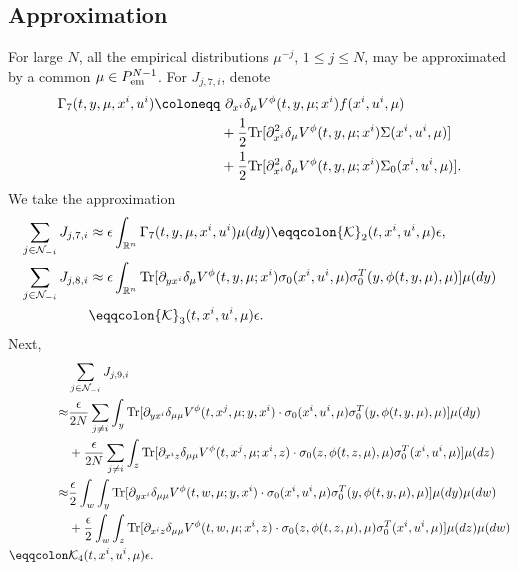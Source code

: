 \documentclass{amsart}
\theoremstyle{definition}
\theoremstyle{remark}
\def\cal{\mathcal}
\def\deltae{\epsilon}
\numberwithin{equation}{section}
\begin{document}
\subsection{Approximation}


For large $N$, all the empirical distributions $\mu^{-j}$, $1\le j\le N$, may be approximated by a common $\mu\in P_{\rm em}^{N-1}$.
For $J_{j,7,i}$, denote \begin{align*}
\Gamma_{7}(t,y,\mu, x^i, u^i)
\coloneqq &\ \partial_{x^i} \delta_{\mu} V^\phi (t, y, \mu; x^i) f(x^i,  u^i,\mu)   \\
& + \frac{1}{2} {\rm Tr} [\partial^2_{x^i} \delta_{\mu} V^\phi (t, y, \mu; x^i)\Sigma(x^i,u^i,\mu  )]\\
& +  \frac{1}{2} {\rm Tr} [\partial^2_{x^i} \delta_{\mu} V^\phi (t, y, \mu; x^i)\Sigma_0(x^i,u^i,\mu  )].
\end{align*}
  We take the approximation
  \begin{align}
\sum_{j\in {\mathcal N}_{-i} } J_{j,7,i}
&\approx\deltae
\int_{{\mathbb R}^n}\Gamma_{7}(t,y,\mu, x^i, u^i)\mu(dy)\eqqcolon {\cal K}_2(t,x^i,u^i, \mu)\deltae,  \notag  \\
\sum_{j\in {\mathcal N}_{-i} } J_{j,8,i}&
\approx \deltae\int_{{\mathbb R}^n}{\rm Tr}[\partial_{yx^i} \delta_{\mu} V^\phi(t,y, \mu; x^i)  %
\sigma_0(x^i, u^i, \mu)\sigma_0^T(y, \phi(t,y,\mu), \mu)]\mu(dy)\nonumber\\
& \eqqcolon {\cal K}_3(t,x^i,u^i,\mu)\deltae . \notag
\end{align}
Next,
\begin{align*}
& \sum_{j\in {\mathcal N}_{-i} } J_{j,9,i}\\
\approx &  \frac{\deltae }{2N}\sum_{j\ne i}\int_y
{\rm Tr}[\partial_{yx^i}\delta_{\mu\mu} V^\phi (t, x^j, \mu; y,x^i) \cdot
\sigma_0(x^i,u^i,\mu)\sigma_0^T(y,\phi(t,y,\mu),\mu)]\mu(dy)\\
&+\frac{\deltae }{2N}\sum_{j\ne i} \int_z{\rm Tr}[\partial_{x^iz}\delta_{\mu\mu} V^\phi (t, x^j, \mu; x^i,z) \cdot \sigma_0(z,\phi(t,z,\mu),\mu)\sigma_0^T(x^i,u^i,\mu)] \mu(dz)\\
\approx&\frac{\deltae}{2}\int_w\int_y
{\rm Tr}[\partial_{yx^i}\delta_{\mu\mu} V^\phi (t, w, \mu; y,x^i) \cdot
\sigma_0(x^i,u^i,\mu)\sigma^T_0(y,\phi(t,y,\mu),\mu)] \mu(dy)\mu(dw)\\
&+\frac{\deltae }{2} \int_w\int_z{\rm Tr}[\partial_{x^iz}\delta_{\mu\mu} V^\phi (t, w, \mu; x^i,z) \cdot \sigma_0(z,\phi(t,z,\mu),\mu)\sigma_0^T(x^i,u^i,\mu)]\mu(dz)\mu(dw)\\
\eqqcolon& {\cal K}_4(t,x^i,u^i, \mu)\deltae.
\end{align*}
\end{document}
